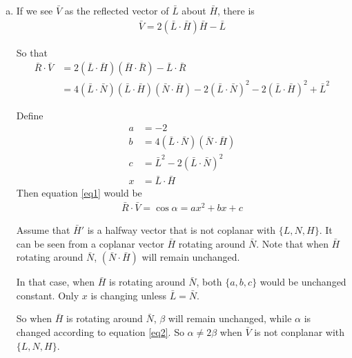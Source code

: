 \documentclass[12pt,a4paper]{article}
\makeatletter
\newtheorem*{solution}{Solution}
\theoremstyle{definition}
\numberwithin{equation}{section}
\numberwithin{figure}{section}
\renewenvironment{solution}[1][Solution] {\par\pushQED{\qed}\normalfont\topsep6\p@\@plus6\p@\relax\trivlist\item[\hskip\labelsep\bfseries#1\@addpunct{.}]\ignorespaces}{\popQED\endtrivlist\@endpefalse} \makeatother
\makeatother
\begin{document}
\begin{enumerate}[a.]
\begin{solution}
		If we see $\bar{V}$ as the reflected vector of $\bar{L}$ about $\bar{H}$, there is
		\begin{align*}
			\bar{V} = 2(\bar{L}\cdot \bar{H})\bar{H}- \bar{L}
		\end{align*}
		
		So that
		\begin{align}
			\bar{R}\cdot\bar{V} &= 2(\bar{L}\cdot \bar{H})(\bar{H}\cdot \bar{R})- \bar{L}\cdot \bar{R}\\
			&=4(\bar{L}\cdot \bar{N})(\bar{L}\cdot \bar{H})(\bar{N}\cdot \bar{H}) - 2 (\bar{L}\cdot \bar{N})^2 - 2(\bar{L}\cdot \bar{H})^2 + \bar{L}^2
			\label{eq1}
		\end{align}
		
		Define
		\begin{align*}
			a &= -2\\
			b &= 4(\bar{L}\cdot \bar{N})(\bar{N}\cdot \bar{H})\\
			c &= \bar{L}^2- 2 (\bar{L}\cdot \bar{N})^2\\
			x &= \bar{L}\cdot \bar{H}
		\end{align*}
		Then equation \ref{eq1} would be 
		\begin{align}
			\bar{R}\cdot\bar{V} =\cos\alpha= ax^2+bx+c
			\label{eq2}
		\end{align}
		
		Assume that $\bar{H}'$ is a halfway vector that is not coplanar with $\{L,N,H\}$. It can be seen from a coplanar vector $\bar{H}$ rotating around $\bar{N}$.	Note that when $\bar{H}$ rotating around $\bar{N}$, $(\bar{N}\cdot \bar{H})$ will remain unchanged.
		
		In that case, when $\bar{H}$ is rotating around $\bar{N}$, both $\{a,b,c\}$ would be unchanged constant. Only $x$ is changing unless $\bar{L}=\bar{N}$.
		
		So when $\bar{H}$ is rotating around $\bar{N}$, $\beta$ will remain unchanged, while $\alpha$ is changed according to equation \ref{eq2}. So $\alpha \neq 2\beta$ when $\bar{V}$ is not conplanar with $\{L,N,H\}$.
		
	\end{solution}
\end{enumerate}

{}

\end{document}
